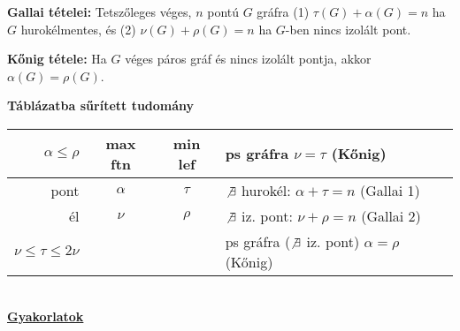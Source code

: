 \documentclass[a4paper, 12pt]{article}
\begin{document}
{\bf Gallai tételei:} Tetszőleges véges, $n$ pontú $G$ gráfra (1)
$\tau(G)+\alpha(G)=n$ ha $G$ hurokélmentes, és (2) $\nu(G)+\rho(G)=n$ ha
$G$-ben nincs izolált pont.

{\bf Kőnig tétele:} Ha $G$ véges páros gráf és nincs izolált pontja, akkor
$\alpha(G)=\rho(G)$.

{\bf Táblázatba sűrített tudomány}

\begin{tabular}{|r|c|c|l|}
\hline
$\alpha\le \rho$  &max ftn&min lef&ps gráfra $\nu=\tau$ (Kőnig)\\
\hline
pont &$\alpha$ & $\tau$& $\not\exists$ hurokél: $\alpha+\tau=n$ (Gallai 1)\\
\hline
él &$\nu$ & $\rho$ & $\not\exists$ iz. pont: $\nu+\rho=n$  (Gallai 2)\\
\hline
$\nu\le \tau\le 2\nu$ &&&ps gráfra ($\not\exists$ iz. pont) $\alpha=\rho$
(Kőnig)\\ 
\hline
\end{tabular}\\

{\bf\large\underline{Gyakorlatok}}
\end{document}
